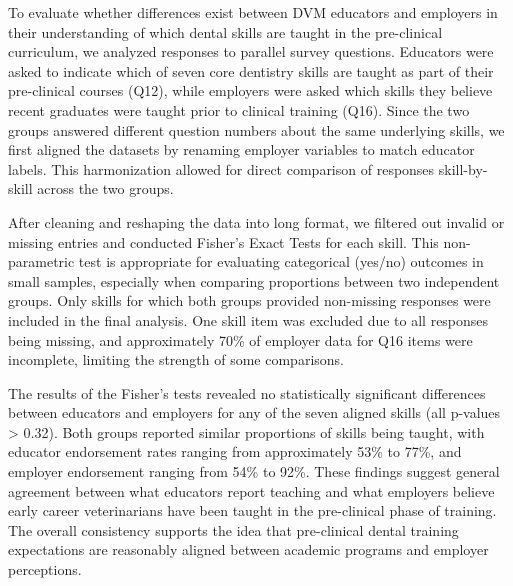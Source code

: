 \documentclass[
  11pt,
  letterpaper,
  DIV=11,
  numbers=noendperiod]{scrartcl}
\numberwithin{figure}{section}
\begin{document}
To evaluate whether differences exist between DVM educators and
employers in their understanding of which dental skills are taught in
the pre-clinical curriculum, we analyzed responses to parallel survey
questions. Educators were asked to indicate which of seven core
dentistry skills are taught as part of their pre-clinical courses (Q12),
while employers were asked which skills they believe recent graduates
were taught prior to clinical training (Q16). Since the two groups
answered different question numbers about the same underlying skills, we
first aligned the datasets by renaming employer variables to match
educator labels. This harmonization allowed for direct comparison of
responses skill-by-skill across the two groups.

After cleaning and reshaping the data into long format, we filtered out
invalid or missing entries and conducted Fisher's Exact Tests for each
skill. This non-parametric test is appropriate for evaluating
categorical (yes/no) outcomes in small samples, especially when
comparing proportions between two independent groups. Only skills for
which both groups provided non-missing responses were included in the
final analysis. One skill item was excluded due to all responses being
missing, and approximately 70\% of employer data for Q16 items were
incomplete, limiting the strength of some comparisons.

The results of the Fisher's tests revealed no statistically significant
differences between educators and employers for any of the seven aligned
skills (all p-values \textgreater{} 0.32). Both groups reported similar
proportions of skills being taught, with educator endorsement rates
ranging from approximately 53\% to 77\%, and employer endorsement
ranging from 54\% to 92\%. These findings suggest general agreement
between what educators report teaching and what employers believe early
career veterinarians have been taught in the pre-clinical phase of
training. The overall consistency supports the idea that pre-clinical
dental training expectations are reasonably aligned between academic
programs and employer perceptions.
\end{document}
